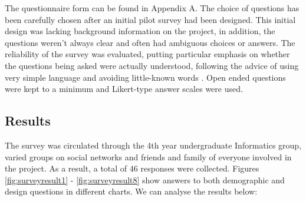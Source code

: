 The questionnaire form can be found in Appendix A. The choice of questions has been carefully chosen after an initial pilot survey had been designed. This initial design was lacking background information on the project, in addition, the questions weren't always clear and often had ambiguous choices or answers. The reliability of the survey was evaluated, putting particular emphasis on whether the questions being asked were actually understood, following the advice of using very simple language and avoiding little-known words \cite{gendall1998framework}. Open ended questions were kept to a minimum and Likert-type answer scales \cite{boone2012analyzing} were used.

\subsection{Results}
The survey was circulated through the 4th year undergraduate Informatics group, varied groups on social networks and friends and family of everyone involved in the project. As a result, a total of 46 responses were collected. Figures \ref{fig:surveyresult1} - \ref{fig:surveyresult8} show answers to both demographic and design questions in different charts. We can analyse the results below:
